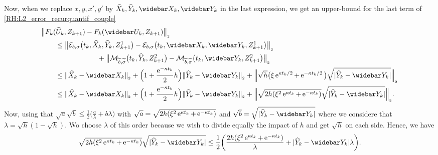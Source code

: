 Now, when we replace $x,y,x',y'$ by $\widehat X_k, \widehat Y_k, \widebar X_k, \widebar Y_k$ in the last expression, we get an upper-bound for the last term of \eqref{RH:L2_error_recurquantif_couple}
\begin{equation}
	\begin{aligned}
		 & \big\Vert F_k(\widehat U_k, Z_{k+1}) - F_k(\widebar U_k, Z_{k+1}) \big\Vert_{_2}                                                                                                                                                                                                                       \\
		 & \qquad \leq \big\Vert \mathcal{E}_{b, \sigma} \big( t_k, \widehat X_k, \widehat Y_k, Z_{k+1}^1 \big) - \mathcal{E}_{b, \sigma} \big( t_k, \widebar X_k, \widebar Y_k, Z_{k+1}^1 \big) \big\Vert_{_2}                                                                                                   \\
		 & \qquad \qquad \qquad \qquad + \big\Vert \mathcal{M}_{\widetilde b, \widetilde \sigma} \big( t_k, \widehat Y_k, Z_{k+1}^2 \big) - \mathcal{M}_{\widetilde b, \widetilde \sigma} \big( t_k, \widebar Y_k, Z_{k+1}^2 \big) \big\Vert_{_2}                                                                 \\
		 & \qquad \leq \Vert \widehat X_k - \widebar X_k \Vert_{_2} + \Big( 1 + \frac{ \e^{- \kappa t_k}}{2} h \Big) \Vert \widehat Y_k - \widebar Y_k \Vert_{_2} + \Big\Vert \sqrt{h} \big( \xi \e^{\kappa t_k /2 } + \e^{- \kappa t_k /2} \big) \sqrt{ \vert \widehat Y_k - \widebar Y_k \vert } \Big\Vert_{_2} \\
		 & \qquad \leq \Vert \widehat X_k - \widebar X_k \Vert_{_2} + \Big( 1 + \frac{ \e^{- \kappa t_k}}{2} h \Big) \Vert \widehat Y_k - \widebar Y_k \Vert_{_2} + \Big\Vert \sqrt{2h ( \xi^2 \e^{\kappa t_k} + \e^{- \kappa t_k} )} \sqrt{ \vert \widehat Y_k - \widebar Y_k \vert } \Big\Vert_{_2}.
	\end{aligned}
\end{equation}
Now, using that $\sqrt{a} \sqrt{b} \leq \frac{1}{2} \big( \frac{a}{\lambda} + b \lambda \big)$ with $\sqrt{a} = \sqrt{2h ( \xi^2 \operatorname{e}^{\kappa t_k} + \operatorname{e}^{- \kappa t_k} )}$ and $\sqrt{b} = \sqrt{ \vert \widehat Y_k - \widebar Y_k \vert }$ where we considere that $\lambda = \sqrt{h} (1 - \sqrt{h})$. Wo choose $\lambda$ of this order because we wish to divide equally the impact of $h$ and get $\sqrt{h}$ on each side. Hence, we have
\begin{equation}
	\begin{aligned}
		\sqrt{2h ( \xi^2 \e^{\kappa t_k} + \e^{- \kappa t_k} )} \sqrt{ \vert \widehat Y_k - \widebar Y_k \vert } \leq \frac{1}{2} \bigg( \frac{2h ( \xi^2 \e^{\kappa t_k} + \e^{- \kappa t_k} ) }{ \lambda } + \vert \widehat Y_k - \widebar Y_k \vert \lambda \bigg).
	\end{aligned}
\end{equation}
